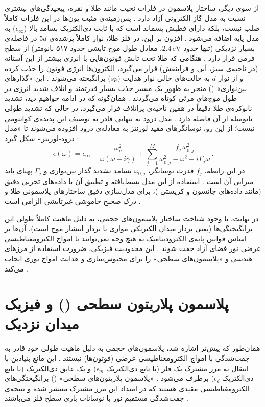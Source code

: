 \documentclass[12pt,a4paper]{report}
\begin{document}
از سوی دیگر، ساختار پلاسمون در فلزات نجیب مانند طلا و نقره، پیچیدگی‌های بیشتری نسبت به مدل گاز الکترونی آزاد دارد \cite{maier}. پس‌زمینه‌ی مثبت یون‌ها در این فلزات کاملاً صلب نیست، بلکه دارای قطبش پسماند است که با ثابت دی‌الکتریک بسامد بالا ($\epsilon_\infty$) به مدل پایه اضافه می‌شود \cite{maier}. افزون بر این، در فلز طلا، نوار کاملاً پرشده‌ی $5d$ در فاصله‌ی بسیار نزدیکی (تنها حدود $2.4\,\mathrm{eV}$، معادل طول موج تابشی حدود ۵۱۷ نانومتر) از سطح فرمی قرار دارد \cite{maier,novotny,jc}. هنگامی که طلا تحت تابش فوتون‌هایی با انرژی بیشتر از این آستانه (در ناحیه‌ی سبز، آبی و فرابنفش) قرار می‌گیرد، الکترون‌ها انرژی فوتون را جذب کرده و از نوار $d$ به حالت‌های خالی نوار هدایت ($sp$) برانگیخته می‌شوند \cite{maier}. این «گذارهای بین‌نواری» () منجر به ظهور یک مسیر جذب بسیار قدرتمند و اتلاف شدید انرژی در طول موج‌های مرئی کوتاه می‌گردند \cite{maier,novotny}. همان‌گونه که در ادامه خواهیم دید، تشدید نانوکره‌ی طلا دقیقاً در همین ناحیه‌ی پراتلاف قرار می‌گیرد، در حالی که تشدید طولی نانومیله از آن فاصله دارد \cite{link,sonnichsen}. مدل درود به تنهایی قادر به توصیف این پدیده‌ی کوانتومی نیست؛ از این رو، نوسانگرهای مقید لورنتز به معادله‌ی درود افزوده می‌شوند تا «مدل درود-لورنتز» شکل گیرد \cite{maier,novotny}:
\begin{equation}
\epsilon(\omega)=\epsilon_\infty-\frac{\omega_p^2}{\omega(\omega+i\gamma)}+\sum_{j=1}^{M}\frac{f_j\,\omega_{0,j}^2}{\omega_{0,j}^2-\omega^2-i\Gamma_j\omega}\,.
\end{equation}
در این رابطه، $f_j$ قدرت نوسانگر، $\omega_{0,j}$ بسامد تشدید گذار بین‌نواری و $\Gamma_j$ پهنای باند میرایی آن است \cite{maier,novotny}. استفاده از این مدل بسط‌یافته و تطبیق آن با داده‌های تجربی دقیق (مانند داده‌های جانسون و کریستی \cite{jc})، برای مدل‌سازی دقیق ساختارهای پلاسمونی طلا و درک صحیح خاموشی غیرتابشی الزامی است \cite{maier,novotny}.

در نهایت، با وجود شناخت ساختار پلاسمون‌های حجمی، به دلیل ماهیت کاملاً طولی این برانگیختگی‌ها (یعنی بردار میدان الکتریکی موازی با بردار انتشار موج است)، آن‌ها بر اساس قوانین پایه‌ی الکترودینامیک به هیچ وجه نمی‌توانند با امواج الکترومغناطیسی عرضی نور فضای آزاد جفت شوند \cite{maier}. این محدودیت فیزیکی، ضرورت استفاده از مرزهای هندسی و «پلاسمون‌های سطحی» را برای محبوس‌سازی و هدایت امواج نوری ایجاب می‌کند \cite{maier,barnes}.

\section{پلاسمون پلاریتون سطحی () و فیزیک میدان نزدیک}
همان‌طور که پیش‌تر اشاره شد، پلاسمون‌های حجمی به دلیل ماهیت طولی خود قادر به جفت‌شدگی با امواج الکترومغناطیسی عرضی (فوتون‌ها) نیستند \cite{maier}. این مانع بنیادین با انتقال به مرز مشترک یک فلز (با تابع دی‌الکتریک $\epsilon_m$) و یک عایق دی‌الکتریک (با تابع دی‌الکتریک $\epsilon_d$) برطرف می‌شود \cite{maier}. «پلاسمون پلاریتون‌های سطحی» () برانگیختگی‌های الکترومغناطیسی مقیدی هستند که در امتداد این مرز مشترک منتشر شده و نتیجه‌ی جفت‌شدگی مستقیم نور با نوسانات باری سطح فلز می‌باشند \cite{maier,novotny,barnes}.
\end{document}
